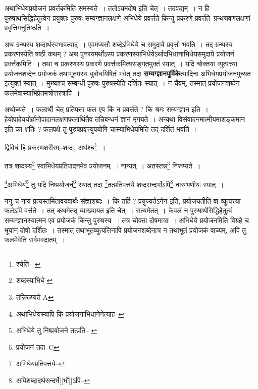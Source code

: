 \documentclass[article,12pt,a4paper]{memoir}
\begin{document}
	  \pstart अथाभिधेयप्रयोजनं प्रवर्त्तकमिति समस्यते । ततोऽयमदोष इति चेत् । तदवद्यम् । न हि पुरुषाथसिद्धिहेतुत्वेन प्रयुक्तः पुरुषः सम्यग्ज्ञानलक्षणे अभिधेये प्रवर्त्तते किन्तु प्रकरणे प्रवर्त्तते--ग्रन्थश्रवणलक्षणां प्रवृत्तिमनुतिष्ठति ।
	\pend
      

	  \pstart अथ ग्रन्थस्य शब्दार्थस्वभावत्वाद् । एवमप्यसौ शब्देऽभिधेये च समुदाये प्रवृत्तो भवति । तद् ग्रन्थस्य प्रकरणस्येति षष्ठी कथम् ? अथ पुनरयमर्थोऽस्य प्रकरणस्याभिधेयेऽर्थादभिधानाभिधेयसमुदाये प्रयोजनं प्रवर्त्तकमिति । तथा च प्रकरणस्य प्रकरणे प्रवर्त्तकमित्यसङ्गतमुक्तं स्यात् । यदि चोक्तया व्युत्पत्त्या प्रयोजनशब्देन प्रयोजकं तथाभूतमस्य बुबोधयिषितं भवेत् तदा \textbf{सम्यग्ज्ञानपूर्विके}त्यादिना अभिधेयप्रयोजनमुच्यत इत्युक्तं स्यात् । मुख्यश्च सम्बन्धी पुरुषः पुरुषस्येति दर्शितः स्यात् । न चैवम्, तस्मात् प्रयोजनशब्देन फलमेवास्याभिप्रेतमत्रोत्तरत्रापि ।
	\pend
      

	  \pstart अथोच्यते । फलार्थी चेत् प्रतिपत्ता फल एव किं न प्रवर्त्तते ? कि श्रमः सम्यग्ज्ञान इति । हेयोपादेययोर्हानोपादानलक्षणफलार्थितैव तन्निबन्धनं ज्ञानं मृगयते । अन्यथा विसंवादनमात्मीयमाशङ्कमान इति का क्षतिः ? फलपक्षे तु पुरुषप्रवृत्त्युपयोगि चास्याभिधेयमिति तद् दर्शितं भवति ।
	\pend
      \leavevmode{}
	  \bigskip
	  \begingroup
	

	  \pstart द्विविधं हि प्रकरणशरीरम्--शब्दः, अर्थश्च\footnote{श्चेति--\cite{dp-edE} \cite{dp-edH} \cite{dp-edN} \cite{dp-edP}} ।
	\pend
       

	  \pstart तत्र शब्दस्य\footnote{शब्दस्याभिधे \cite{dp-msB} \cite{dp-msC} \cite{dp-msD}} स्वाभिधेयप्रतिपादनमेव प्रयोजनम् । नान्यत् । अतस्तन्न\footnote{तन्निरूप्यते A} निरूप्यते ।
	\pend
       

	  \pstart \footnote{अथाभिधेयस्यापि किं प्रयोजनाभिधानेनेत्याह--\cite{dp-msD-n}}अभिधेयं\footnote{अभिधेये तु निष्प्रयोजने तत्प्रति--\cite{dp-msB} \cite{dp-msD}} तु यदि निष्प्रयोजनं\footnote{प्रयोजनं तदा--C} स्यात् तदा \footnote{अभिधेयप्रतिपत्तये--\cite{dp-msD-n}}तत्प्रतिपत्तये शब्दसन्दर्भोऽपि\footnote{अपिशब्दादर्थसन्दर्भे[[र्भो]]ऽपि--\cite{dp-msD-n}} नारम्भणीयः स्यात् ।
	\pend
      
	  \endgroup
	

	  \pstart ननु च नायं प्रत्यस्तमितावयवार्थः संज्ञाशब्दः । किं तर्हि ? प्रयुज्यतेऽनेन इति, प्रयोजयतीति वा व्युत्पत्त्या फलेऽपि वर्त्तते । तत् कथमेतद् व्याख्यायत इति चेत् । सत्यमेतत् । केवलं न पुरुषार्थसिद्धिहेतुत्वं सम्यग्ज्ञानस्यात्मन एव प्रयोजकं किन्तु पुरुषस्य । तत्र चोक्ता दोषमात्रा । अभिधेये प्रयोजनमिति विग्रहे च भूयान् दोषो दर्शितः । तस्मात् तथाभूतव्युत्पत्तिनापि प्रयोजनशब्देनात्र न तथाभूतं प्रयोजकं वाच्यम्, अपि तु फलमेवेति सर्वमवदातम् ।
	\pend
      
\end{document}
